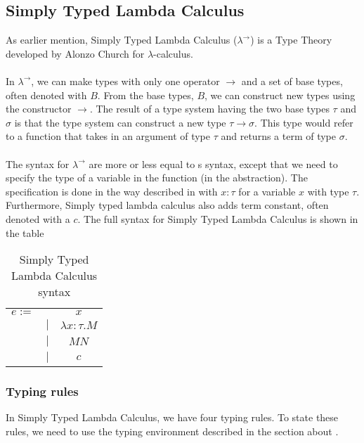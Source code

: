 \subsection{Simply Typed Lambda Calculus}
\label{Simply Typed Lambda Calculus}
As earlier mention, Simply Typed Lambda Calculus 
($\lambda^\rightarrow$) is a Type Theory developed by Alonzo Church for $\lambda$-calculus. \\ \\
In $\lambda^\rightarrow$, we can make types with only one operator $\rightarrow$ and a set of base types,
 often denoted with $B$. From the base types, $B$, we can construct new types using the constructor 
 $\rightarrow$. The result of a type system having the two base types $\tau$ and $\sigma$ is that the type system can construct a new type $\tau \rightarrow \sigma$. This type would refer to a function that takes in an argument of type $\tau$ and returns a term of type $\sigma$. \\ \\
The syntax for $\lambda^\rightarrow$ are more or less equal to s syntax, except that we need to specify the type of a variable in the function (in the abstraction).
The specification is done in the way described in  with $x:\tau$ for a variable $x$ with type $\tau$. Furthermore, Simply typed lambda calculus also adds term constant, often denoted with a $c$. The full syntax for 
Simply Typed Lambda Calculus is shown in the table  \\

\begin{table}[]
    \centering
    \begin{tabular}{c c c}
         $e :=$&  & $x$\\
         & $|$ & $\lambda x:\tau.M$ \\
         & $|$ &  $M N$ \\
         & $|$ &  $c$ \\
    \end{tabular}
    \caption{Simply Typed Lambda Calculus syntax}
    \label{tab:STLC syntax}
\end{table}

\subsubsection{Typing rules}
In Simply Typed Lambda Calculus, we have four typing rules. 
To state these rules, we need to use the typing environment described in the section about .

